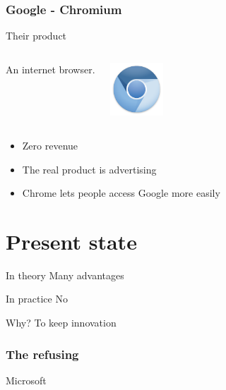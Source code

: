 \documentclass{beamer}
\begin{document}
\begin{frame}

  \frametitle{Google - Chromium}

  \begin{block}{Their product}
    \begin{columns}[c]

      An internet browser.

      \includegraphics[width=2cm]{logo_chromium.png}

    \end{columns}
  \end{block}

  \vfill

  \begin{itemize}
    \item<2->{Zero revenue}
    \item<3->{The real product is advertising}
    \item<4>{Chrome lets people access Google more easily}
  \end{itemize}

\end{frame}

\section{Present state}

\begin{frame}

  \begin{block}{In theory}
    Many advantages
  \end{block}

  \begin{block}{In practice}
    No
  \end{block}

  Why?
  To keep innovation

\end{frame}

\begin{frame}

  \frametitle{The refusing}

  Microsoft

\end{frame}
\end{document}
